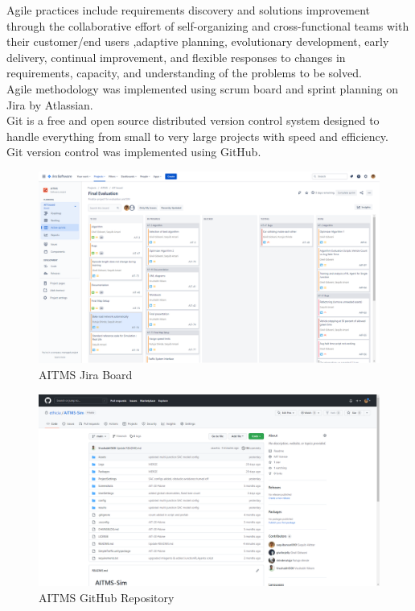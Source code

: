 \documentclass[openany,12pt]{report}
\begin{document}
	\hspace*{0.5 in}Agile practices include requirements discovery and solutions improvement through the collaborative effort of self-organizing and cross-functional teams with their customer/end users ,adaptive planning, evolutionary development, early delivery, continual improvement, and flexible responses to changes in requirements, capacity, and understanding of the problems to be solved.\\
	\hspace*{0.5in}Agile methodology was implemented using scrum board and sprint planning on Jira by Atlassian.\\
	\hspace*{0.5in}Git is a free and open source distributed version control system designed to handle everything from small to very large projects with speed and efficiency.\\
	\hspace*{0.5in}Git version control was implemented using GitHub.
	\begin{figure}[H]
			\centering
			\includegraphics[width=6in]{./Diagrams/PNG/jira}
			\caption{AITMS Jira Board}
	\end{figure}	
	
	\begin{figure}[H]
			\centering
			\includegraphics[width=6in]{./Diagrams/PNG/github}
			\caption{AITMS GitHub Repository}
	\end{figure}	
	
\end{document}
